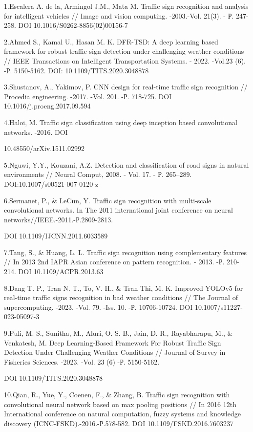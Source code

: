 \begin{noparindent}
1.Escalera A. de la, Armingol J.M., Mata M. Traffic sign recognition and
analysis for intelligent vehicles // Image and vision computing.
-2003.-Vol. 21(3). - Р. 247-258. DOI 10.1016/S0262-8856(02)00156-7

2.Ahmed S., Kamal U., Hasan M. K. DFR-TSD: A deep learning based
framework for robust traffic sign detection under challenging weather
conditions // IEEE Transactions on Intelligent Transportation Systems. -
2022. -Vol.23 (6). -Р. 5150-5162. DOI: 10.1109/TITS.2020.3048878

3.Shustanov, A., Yakimov, P. CNN design for real-time traffic sign
recognition // Procedia engineering. -2017. -Vol. 201. -Р. 718-725. DOI
10.1016/j.proeng.2017.09.594

4.Haloi, M. Traffic sign classification using deep inception based
convolutional networks. -2016. DOI

10.48550/arXiv.1511.02992

5.Nguwi, Y.Y., Kouzani, A.Z. Detection and classification of road signs
in natural environments // Neural Comput, 2008. - Vol. 17. - Р.
265--289. DOI:10.1007/s00521-007-0120-z

6.Sermanet, P., \& LeCun, Y. Traffic sign recognition with multi-scale
convolutional networks. In The 2011 international joint conference on
neural networks//IEEE.-2011.-Р.2809-2813.

DOI 10.1109/IJCNN.2011.6033589

7.Tang, S., \& Huang, L. L. Traffic sign recognition using complementary
features // In 2013 2nd IAPR Asian conference on pattern recognition. -
2013. -Р. 210-214. DOI 10.1109/ACPR.2013.63

8.Dang T. P., Tran N. T., To, V. H., \& Tran Thi, M. K. Improved YOLOv5
for real-time traffic signs recognition in bad weather conditions // The
Journal of supercomputing. -2023. -Vol. 79. -Iss. 10. -Р. 10706-10724.
DOI 10.1007/s11227-023-05097-3

9.Puli, M. S., Sunitha, M., Aluri, O. S. B., Jain, D. R., Rayabharapu,
M., \& Venkatesh, M. Deep Learning-Based Framework For Robust Traffic
Sign Detection Under Challenging Weather Conditions // Journal of Survey
in Fisheries Sciences. -2023. -Vol. 23 (6) -Р. 5150-5162.

DOI 10.1109/TITS.2020.3048878

10.Qian, R., Yue, Y., Coenen, F., \& Zhang, B. Traffic sign recognition
with convolutional neural network based on max pooling positions // In
2016 12th International conference on natural computation, fuzzy systems
and knowledge discovery (ICNC-FSKD).-2016.-Р.578-582. DOI
10.1109/FSKD.2016.7603237


\end{noparindent}
